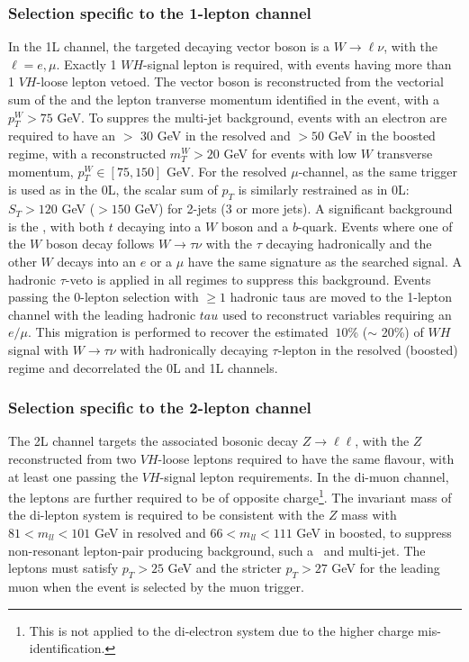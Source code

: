 \subsubsection{Selection specific to the 1-lepton channel}
In the 1L channel, the targeted decaying vector boson is a $W \rightarrow \ell\nu$, with the $\ell = e, \mu$. Exactly 1 $WH$-signal lepton is required, with events having more than 1 $VH$-loose lepton vetoed. The vector boson is reconstructed from the vectorial sum of the \etm and the lepton tranverse momentum identified in the event, with a $p_T^W > 75$ GeV. To suppres the multi-jet background, events with an electron are required to have an \etm $>$ 30 GeV in the resolved and $> 50$ GeV in the boosted regime, with a reconstructed $m_T^W > 20$ GeV for events with low $W$ transverse momentum, $p_T^W \in [75, 150]$ GeV. For the resolved $\mu$-channel, as the same \etm trigger is used as in the 0L, the scalar sum of $p_T$ is similarly restrained as in 0L: $S_T > 120$ GeV ($> 150$ GeV) for 2-jets (3 or more jets). A significant background is the \ttb, with both $t$ decaying into a $W$ boson and a $b$-quark. Events where one of the $W$ boson decay follows $W \rightarrow \tau \nu$ with the $\tau$ decaying hadronically and the other $W$ decays into an $e$ or a $\mu$ have the same signature as the searched signal. A hadronic $\tau$-veto is applied in all regimes to suppress this background. Events passing the 0-lepton selection with $\geq 1$ hadronic taus are moved to the 1-lepton channel with the leading hadronic $tau$ used to reconstruct variables requiring an $e/\mu$. This migration is performed to recover the estimated $~10$\% ($\sim$ 20\%) of $WH$ signal with $W\rightarrow \tau \nu$ with hadronically decaying $\tau$-lepton in the resolved (boosted) regime and decorrelated the 0L and 1L channels.

\subsubsection{Selection specific to the 2-lepton channel}
The 2L channel targets the associated bosonic decay $Z \rightarrow\ell\ell$, with the $Z$ reconstructed from two $VH$-loose leptons required to have the same flavour, with at least one passing the $VH$-signal lepton requirements. In the di-muon channel, the leptons are further required to be of opposite charge\footnote{This is not applied to the di-electron system due to the higher charge mis-identification.}. The invariant mass of the di-lepton system is required to be consistent with the $Z$ mass with $81 < m_{ll} < 101$ GeV in resolved and $66 < m_{ll} < 111$ GeV in boosted, to suppress non-resonant lepton-pair producing background, such a \ttb\ and multi-jet. The leptons must satisfy $p_T > 25$ GeV and the stricter $p_T > 27$ GeV for the leading muon when the event is selected by the muon trigger.

